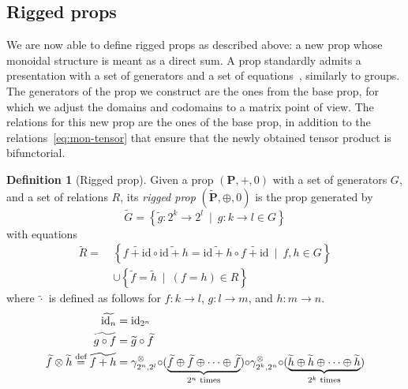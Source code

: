 \documentclass[a4paper]{article}
\theoremstyle{plain}
\theoremstyle{definition}
\newtheorem{definition}[theorem]{Definition}
\newcommand{\alt}{~\mid~}
\newcommand{\cat}[1]{\mathbf{#1}}
\newcommand{\kcat}[1]{\mathbf{\widetilde{#1}}}
\newcommand{\symtimes}{\gamma^\otimes}
\newcommand{\defeq}{\stackrel{\textrm{{\scriptsize def}}}{=}}
\newcommand{\iid}{\mathrm{id}}
\begin{document}
\subsection{Rigged props}

We are now able to define rigged props as described above: a new prop whose
monoidal structure is meant as a direct sum. A prop standardly admits a
presentation with a set of generators and a set of
equations~\cite{baezetal:props}, similarly to groups. The generators of the
prop we construct are the ones from the base prop, for which we adjust the
domains and codomains to a matrix point of view. The relations for this new
prop are the ones of the base prop, in addition to the
relations~\eqref{eq:mon-tensor} that ensure that the newly obtained tensor
product is bifunctorial.

\begin{definition}[Rigged prop]
	\label{def:kprop}
	Given a prop $(\cat P,+,0)$ with a set of generators $G$, and a set of
	relations $R$, its \emph{rigged prop} $(\kcat P,\oplus, 0)$ is the prop
	generated by
	\begin{equation}\label{eq:kgen}
		\widetilde G = \left\{ \widetilde g \colon 2^k \to 2^l \alt g \colon k \to l \in G \right\}
	\end{equation}
 with equations
	\begin{align}
		\label{eq:mon-tensor}
		\widetilde R =~&
		\left\{ \widetilde{f + \iid} \circ \widetilde{\iid + h} = \widetilde{\iid + h} \circ
		\widetilde{f + \iid} \alt f,h \in G \right\} \\
		\label{eq:base-rel}
		&\cup
		\left\{ \widetilde f = \widetilde h \alt (f = h) \in R \right\}
	\end{align}
	where $\widetilde \cdot$ is defined as follows for $f \colon k \to l$, $g \colon l \to m$,
	and $h \colon m \to n$.
	\begin{align}
		\widetilde{\iid_n} &= \iid_{2^n} \\
		\widetilde{g \circ f} &= \widetilde g \circ \widetilde f \\
		\label{eq:new-tensor}
		\widetilde f \otimes \widetilde h \defeq \widetilde{f + h} &= \symtimes_{2^n, 2^l} {\circ}
		(\underbrace{\widetilde f \oplus \widetilde f \oplus \cdots \oplus \widetilde f}_{2^n\text{
			times}}) {\circ} \symtimes_{2^k,2^n} {\circ} (\underbrace{\widetilde h \oplus \widetilde h
		\oplus \cdots \oplus \widetilde h}_{2^k\text{ times}})
	\end{align}
\end{definition}
\end{document}
